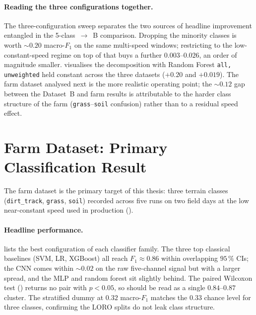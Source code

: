 \paragraph{Reading the three configurations together.}
The three-configuration sweep separates the two sources of headline improvement entangled in the 5-class~$\to$~B comparison. Dropping the minority classes is worth $\sim 0.20$ macro-$F_1$ on the same multi-speed windows; restricting to the low-constant-speed regime on top of that buys a further $0.003$--$0.026$, an order of magnitude smaller.  visualises the decomposition with Random Forest \texttt{all, unweighted} held constant across the three datasets ($+0.20$ and $+0.019$). The farm dataset analysed next is the more realistic operating point; the $\sim 0.12$ gap between the Dataset~B and farm results is attributable to the harder class structure of the farm (\texttt{grass}--\texttt{soil} confusion) rather than to a residual speed effect.

\section{Farm Dataset: Primary Classification Result}
\label{sec:res_farm}

The farm dataset is the primary target of this thesis: three terrain classes (\texttt{dirt\_track}, \texttt{grass}, \texttt{soil}) recorded across five runs on two field days at the low near-constant speed used in production ().

\paragraph{Headline performance.}
 lists the best configuration of each classifier family. The three top classical baselines (SVM, LR, XGBoost) all reach $F_1 \approx 0.86$ within overlapping $95\,\%$ CIs; the CNN comes within $\sim 0.02$ on the raw five-channel signal but with a larger spread, and the MLP and random forest sit slightly behind. The paired Wilcoxon test () returns no pair with $p < 0.05$, so  should be read as a single $0.84$--$0.87$ cluster. The stratified dummy at $0.32$ macro-$F_1$ matches the $0.33$ chance level for three classes, confirming the LORO splits do not leak class structure.

